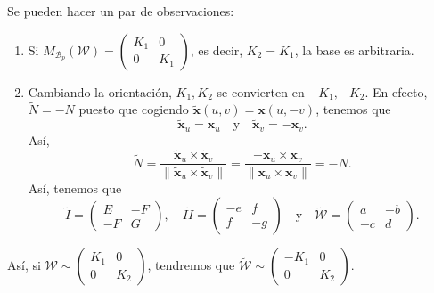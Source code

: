 \begin{observation} Se pueden hacer un par de observaciones:
	\begin{enumerate}
	\item Si $\displaystyle M_{\mathcal{B}_{p}}\left(\mathcal{W}\right)=\begin{pmatrix} K_{1} & 0 \\ 0 & K_{1} \end{pmatrix} $, es decir, $\displaystyle K_{2}=K_{1} $, la base es arbitraria.
	\item Cambiando la orientación, $\displaystyle K_{1}, K_{2} $ se convierten en $\displaystyle -K_{1}, -K_{2} $. En efecto, $\displaystyle \tilde{N} = - N $ puesto que cogiendo $\displaystyle \tilde{ \textbf{x} }\left(u,v\right)= \textbf{x} \left(u,-v\right) $, tenemos que 
		\[ \tilde{ \textbf{x} }_{u}= \textbf{x} _{u} \quad \text{y} \quad \tilde{ \textbf{x} }_{v}= -\textbf{x} _{v}.\]
	Así, 
	\[\tilde{N} = \frac{\tilde{ \textbf{x} }_{u}\times \tilde{ \textbf{x} }_{v}}{\|\tilde{ \textbf{x} }_{u} \times \tilde{ \textbf{x} }_{v}\|} = \frac{- \textbf{x} _{u} \times \textbf{x} _{v}}{\| \textbf{x} _{u}\times \textbf{x} _{v}\|}=-N.\]
	Así, tenemos que 
	\[\tilde{I} = \begin{pmatrix}  E & -F \\ - F & G \end{pmatrix}, \quad \widetilde{II} = \begin{pmatrix} -e & f \\ f & - g \end{pmatrix} \quad \text{y} \quad \widetilde{ \mathcal{W}} = \begin{pmatrix} a & - b \\ - c & d \end{pmatrix} .\]
	\end{enumerate}
	Así, si $\displaystyle \mathcal{W}\sim \begin{pmatrix} K_{1} & 0 \\ 0 & K_{2} \end{pmatrix} $, tendremos que $\displaystyle \widetilde{\mathcal{W}}\sim\begin{pmatrix} -K_{1} & 0 \\ 0 & K_{2} \end{pmatrix} $.  
\end{observation}
